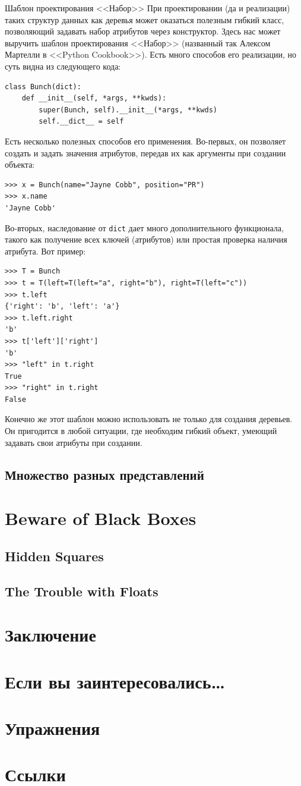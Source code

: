\begin{notice}{Шаблон проектирования <<Набор>>}
При проектировании (да и реализации) таких структур данных как деревья может оказаться полезным гибкий класс, позволяющий задавать набор атрибутов через конструктор. Здесь нас может выручить шаблон проектирования <<Набор>> (названный так Алексом Мартелли в <<Python Cookbook>>). Есть много способов его реализации, но суть видна из следующего кода:
\begin{lstlisting}
class Bunch(dict):
	def __init__(self, *args, **kwds):
		super(Bunch, self).__init__(*args, **kwds)
		self.__dict__ = self
\end{lstlisting}

Есть несколько полезных способов его применения. Во-первых, он позволяет создать и задать значения атрибутов, передав их как аргументы при создании объекта:
\begin{lstlisting}
>>> x = Bunch(name="Jayne Cobb", position="PR")
>>> x.name
'Jayne Cobb'
\end{lstlisting}

Во-вторых, наследование от \texttt{dict} дает много дополнительного функционала, такого как получение всех ключей (атрибутов) или простая проверка наличия атрибута. Вот пример:
\begin{lstlisting}
>>> T = Bunch
>>> t = T(left=T(left="a", right="b"), right=T(left="c"))
>>> t.left
{'right': 'b', 'left': 'a'}
>>> t.left.right
'b'
>>> t['left']['right']
'b'
>>> "left" in t.right
True
>>> "right" in t.right
False
\end{lstlisting}

Конечно же этот шаблон можно использовать не только для создания деревьев. Он пригодится в любой ситуации, где необходим гибкий объект, умеющий задавать свои атрибуты при создании.
\end{notice}

\subsection{Множество разных представлений}

\newpage
\section{Beware of Black Boxes}
\subsection{Hidden Squares}
\subsection{The Trouble with Floats}
\section{Заключение}
\section{Если вы заинтересовались…}
\section{Упражнения}
\section{Ссылки}





